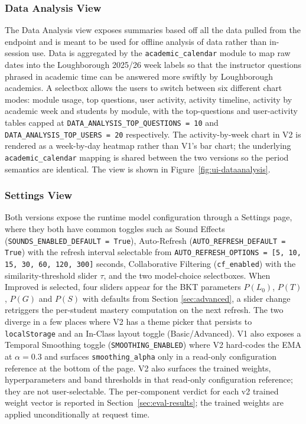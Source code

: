 
\subsubsection{Data Analysis View}

The Data Analysis view exposes summaries based off all the data pulled from the endpoint and is meant to be used for offline analysis of data rather than in-session use. 
Data is aggregated by the \texttt{academic\_calendar} module to map raw dates into the Loughborough 2025/26 week labels so that the instructor questions phrased in academic time can be answered more swiftly by Loughborough academics. 
A selectbox allows the users to switch between six different chart modes:  module usage, top questions, user activity, activity timeline, activity by academic week and students by module, with the top-questions and user-activity tables capped at \texttt{DATA\_ANALYSIS\_TOP\_QUESTIONS = 10} and \texttt{DATA\_ANALYSIS\_TOP\_USERS = 20} respectively. 
The activity-by-week chart in V2 is rendered as a week-by-day heatmap rather than V1's bar chart; the underlying \texttt{academic\_calendar} mapping is shared between the two versions so the period semantics are identical. The view is shown in Figure~\ref{fig:ui-dataanalysis}.


\subsubsection{Settings View}

Both versions expose the runtime model configuration through a Settings page, where they both have common toggles such as Sound Effects (\texttt{SOUNDS\_ENABLED\_DEFAULT = True}), Auto-Refresh (\texttt{AUTO\_REFRESH\_DEFAULT = True}) with the refresh interval selectable from \texttt{AUTO\_REFRESH\_OPTIONS = [5, 10, 15, 30, 60, 120, 300]} seconds, Collaborative Filtering (\texttt{cf\_enabled}) with the similarity-threshold slider $\tau$, and the two model-choice selectboxes. 
When Improved is selected, four sliders appear for the BKT parameters $P(L_0)$, $P(T)$, $P(G)$ and $P(S)$ with defaults from Section \ref{sec:advanced}, a slider change retriggers the per-student mastery computation on the next refresh. 
The two diverge in a few places where V2 has a theme picker that persists to \texttt{localStorage} and an In-Class layout toggle (Basic/Advanced). V1 also exposes a Temporal Smoothing toggle (\texttt{SMOOTHING\_ENABLED}) where V2 hard-codes the EMA at $\alpha = 0.3$ and surfaces \texttt{smoothing\_alpha} only in a read-only configuration reference at the bottom of the page. 
V2 also surfaces the trained weights, hyperparameters and band thresholds in that read-only configuration reference; they are not user-selectable.
The per-component verdict for each v2 trained weight vector is reported in Section~\ref{sec:eval-results}; the trained weights are applied unconditionally at request time.

